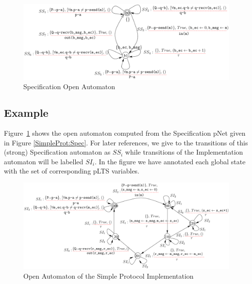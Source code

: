 \documentclass{lmcs}
\newcommand{\TODO}[1]{\textcolor{red}{\textbf{[TODO:#1]}}}
\begin{document}






\begin{figure}[ht]
   \centerline{\includegraphics[width=13cm]{XFIG/SPSpecOpen}}
   \caption{Specification Open Automaton}
   \label{SimpleProtCounter:SpecOA}
\end{figure}


\subsection*{Example}  Figure~\ref{SimpleProtCounter:SpecOA} shows the open automaton computed from the Specification pNet given in Figure \ref{SimpleProt:Spec}. 
For later references, we give to the transitions of this (strong)
Specification automaton as $SS_i$ while transitions of the
Implementation automaton will be labelled $SI_i$. In the figure we
have annotated each global state with the set of corresponding pLTS variables.


 \begin{figure}[ht]
  \centerline{\includegraphics[width=15cm]{XFIG/SPImplOpen}}
  \caption{Open Automaton of the Simple Protocol Implementation}  \label{SimpleProtCounter:ImplOA}
\end{figure}
\end{document}
